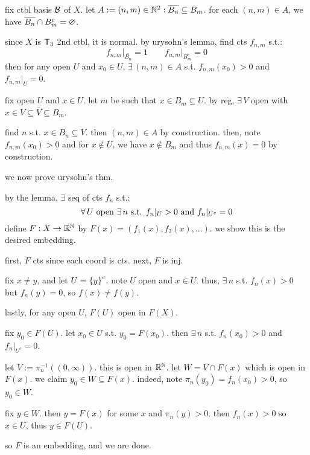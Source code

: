 \begin{pf}[source=Primary Source Material]
    fix ctbl basis $\mathcal{B}$ of $X$.
    let $A:=(n,m)\in\mathbb{N}^{2}:\overline{B_{n}}\subseteq B_{m}$.
    for each $(n,m)\in A$, we have $\overline{B_{n}}\cap B_{m}^{c}=\varnothing$.

    since $X$ is $\mathsf{T}_{3}$ 2nd ctbl, it is normal.
    by urysohn's lemma, find cts $f_{n,m}$ s.t.:
    \begin{equation*}
        f_{n,m}\rvert_{\bar{B_{n}}}=1 \qquad
        f_{n,m}\rvert_{B_{m}^{c}}=0
    \end{equation*}
    then for any open $U$ and $x_{0}\in U$, $\exists \, (n,m)\in A$ s.t.
    $f_{n,m}(x_{0})>0$ and $f_{n,m}\rvert_{U}=0$.
    \begin{block}
        fix open $U$ and $x\in U$.
        let $m$ be such that $x\in B_{m}\subseteq U$.
        by reg, $\exists \, V$ open with $x\in V\subseteq\bar{V}\subseteq B_{m}$.

        find $n$ s.t. $x\in B_{n}\subseteq V$. then $(n,m)\in A$ by construction.
        then, note $f_{n,m}(x_{0})>0$ and for $x\notin U$, we have
        $x\notin B_{m}$ and thus $f_{n,m}(x)=0$ by construction.
    \end{block}
\end{pf}
we now prove urysohn's thm.

by the lemma, $\exists$ seq of cts $f_{n}$ s.t.:
\begin{equation*}
    \forall \, U \textrm{ open } \exists \, n \textrm{ s.t. }
    f_{n}\rvert_{U}>0 \textrm{ and } f_{n}\rvert_{U^{c}}=0
\end{equation*}
define $F:X\rightarrow\mathbb{R}^{\mathbb{N}}$ by $F(x)=(f_{1}(x),f_{2}(x),\dots)$.
we show this is the desired embedding.

first, $F$ cts since each coord is cts.
next, $F$ is inj.
\begin{block}
    fix $x\neq y$, and let $U=\left\{{y}\right\}^{c}$. note $U$ open and $x\in U$.
    thus, $\exists \, n$ s.t. $f_{n}(x)>0$ but $f_{n}(y)=0$, so $f(x)\neq f(y)$.
\end{block}
lastly, for any open $U$, $F(U)$ open in $F(X)$.
\begin{block}
    fix $y_{0}\in F(U)$. let $x_{0}\in U$ s.t. $y_{0}=F(x_{0})$.
    then $\exists \, n$ s.t. $f_{n}(x_{0})>0$ and $f_{n}\rvert_{U^{c}}=0$.

    let $V:=\pi_{n}^{-1}((0,\infty))$. this is open in $\mathbb{R}^{\mathbb{N}}$.
    let $W=V\cap F(x)$ which is open in $F(x)$.
    we claim $y_{0}\in W\subseteq F(x)$.
    indeed, note $\pi_{n}(y_{0})=f_{n}(x_{0})>0$, so $y_{0}\in W$.

    fix $y\in W$. then $y=F(x)$ for some $x$ and $\pi_{n}(y)>0$.
    then $f_{n}(x)>0$ so $x\in U$, thus $y\in F(U)$.
\end{block}
so $F$ is an embedding, and we are done.

